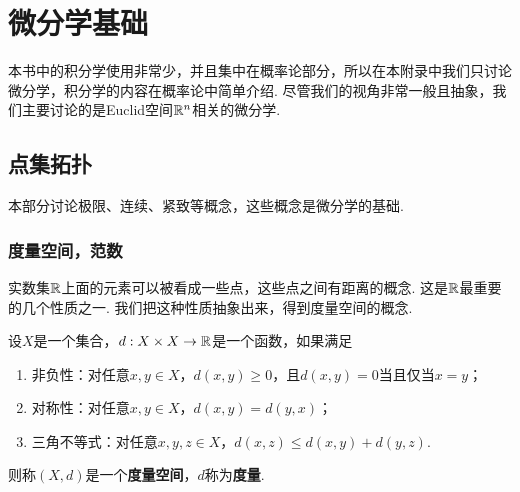 \chapter{微分学基础}\label{chap:calculus}
本书中的积分学使用非常少，并且集中在概率论部分，所以在本附录中我们只讨论微分学，积分学的内容在概率论中简单介绍. 尽管我们的视角非常一般且抽象，我们主要讨论的是Euclid空间$\mathbb{R}^n$相关的微分学. 

\section{点集拓扑}\label{sec:topology}
本部分讨论极限、连续、紧致等概念，这些概念是微分学的基础. 

\subsection{度量空间，范数}\label{subsec:metric-norm}
实数集$\mathbb{R}$上面的元素可以被看成一些点，这些点之间有距离的概念. 这是$\mathbb{R}$最重要的几个性质之一. 我们把这种性质抽象出来，得到度量空间的概念. 

\begin{definition}[度量空间]
设$X$是一个集合，$d:X\times X\to\mathbb{R}$是一个函数，如果满足
\begin{enumerate}
    \item 非负性：对任意$x,y\in X$，$d(x,y)\geq 0$，且$d(x,y)=0$当且仅当$x=y$；
    \item 对称性：对任意$x,y\in X$，$d(x,y)=d(y,x)$；
    \item 三角不等式：对任意$x,y,z\in X$，$d(x,z)\leq d(x,y)+d(y,z)$. 
\end{enumerate}
则称$(X,d)$是一个\textbf{度量空间}，$d$称为\textbf{度量}. 
\end{definition}

